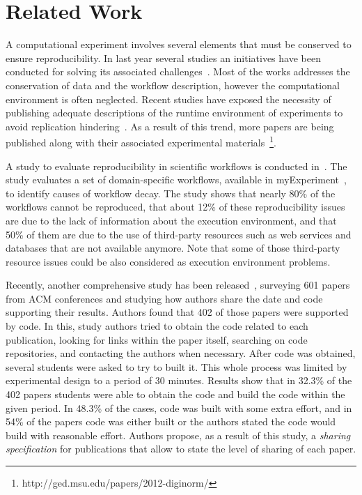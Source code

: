 \section{Related Work}
\label{sec:related-work}

A computational experiment involves several elements that must be conserved to ensure reproducibility. In last year several studies an initiatives have been conducted for solving its associated challenges~\cite{Hothorn01052011,Sylwester14}. Most of the works addresses the conservation of data and the workflow description, however the computational environment is often neglected. Recent studies have exposed the necessity of publishing adequate descriptions of the runtime environment of experiments to avoid replication hindering~\cite{Rollins201459}. As a result of this trend, more papers are being published\cite{Brown2012} along with their associated experimental materials~\footnote{http://ged.msu.edu/papers/2012-diginorm/}.

A study to evaluate reproducibility in scientific workflows is conducted in~\cite{zhao2012}. The study evaluates a set of domain-specific workflows, available in  myExperiment~\cite{myExperiment}, to identify causes of workflow decay. The study shows that nearly 80\% of the workflows cannot be reproduced, that about 12\% of these reproducibility issues are due to the lack of information about the execution environment, and that 50\% of them are due to the use of third-party resources such as web services and databases that are not available anymore. Note that some of those third-party resource issues could be also considered as execution environment problems. 

Recently, another comprehensive study has been released~\cite{Collberg2015}, surveying 601 papers from ACM conferences and studying how authors share the date and code supporting their results. Authors found that 402 of those papers were supported by code. In this, study authors tried to obtain the code related to each publication, looking for links within the paper itself, searching on code repositories, and contacting the authors when necessary. After code was obtained, several students were asked to try to built it. This whole process was limited by experimental design to a period of 30 minutes. Results show that in 32.3\% of the 402 papers students were able to obtain the code and build the code within the given period. In 48.3\% of the cases, code was built with some extra effort, and in 54\% of the papers code was either built or the authors stated the code would build with reasonable effort. Authors propose, as a result of this study, a {\it sharing specification} for publications that allow to state the level of sharing of each paper.

